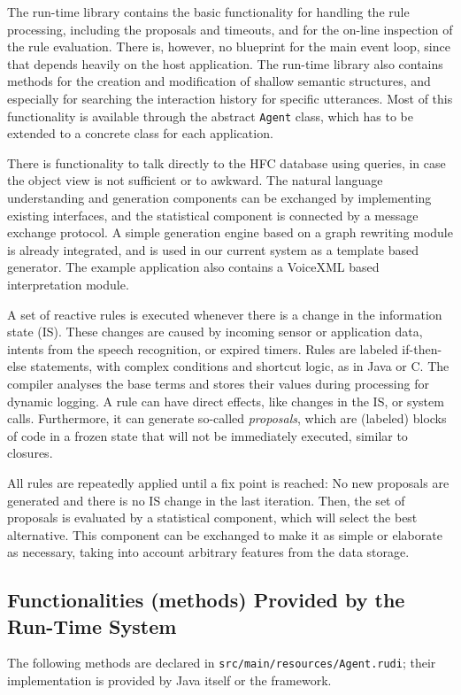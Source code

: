 The run-time library contains the basic functionality for handling the rule
processing, including the proposals and timeouts, and for the on-line
inspection of the rule evaluation. There is, however, no blueprint for the main
event loop, since that depends heavily on the host application. The run-time library also
contains methods for the creation and modification of shallow semantic
structures, and especially for searching the interaction history for specific
utterances. Most of this functionality is available through the abstract
\texttt{Agent} class, which has to be extended to a concrete class for each
application.

There is functionality to talk directly to the HFC database using queries, in
case the object view is not sufficient or to awkward. The natural language
understanding and generation components can be exchanged by implementing existing
interfaces, and the statistical component is connected by a message exchange
protocol. A simple generation engine based on a graph rewriting module is
already integrated, and is used in our current system as a template based
generator. The example application also contains a VoiceXML based
interpretation module.

A set of reactive rules is executed whenever there is a change in the
information state (IS). These changes are caused by incoming sensor or
application data, intents from the speech recognition, or expired timers.
Rules are labeled if-then-else statements, with complex conditions and shortcut
logic, as in Java or C. The compiler analyses the base terms and stores their
values during processing for dynamic logging. A rule can have direct effects,
like changes in the IS, or system calls. Furthermore, it can generate so-called
\emph{proposals}, which are (labeled) blocks of code in a frozen state that
will not be immediately executed, similar to closures.

All rules are repeatedly applied until a fix point is reached: No new proposals
are generated and there is no IS change in the last iteration. Then, the set of
proposals is evaluated by a statistical component, which will select the best
alternative. This component can be exchanged to make it as simple or elaborate
as necessary, taking into account arbitrary features from the data storage.

\subsection{Functionalities (methods) Provided by the Run-Time System}
The following methods are declared in \texttt{src/main/resources/Agent.rudi}; their implementation is provided by Java itself or the \vonda framework.

